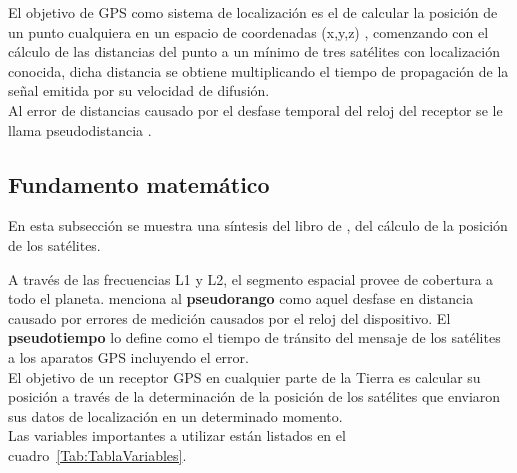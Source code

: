 El objetivo de GPS como sistema de localización es el de calcular la posición de un punto cualquiera en un espacio de coordenadas (x,y,z) \citep{sonnenberg2013radar}, comenzando con el cálculo de las distancias del punto a un mínimo de tres satélites con localización conocida, dicha distancia se obtiene multiplicando el tiempo de propagación de la señal emitida por su velocidad de difusión.\\

Al error de distancias causado por el desfase temporal del reloj del receptor se le llama pseudodistancia \citep{pozo2000sistema}.


\subsection{Fundamento matemático}

En esta subsección se muestra una síntesis del libro de \cite{farrell2008aided}, del cálculo de la posición de los satélites.

A través de las frecuencias L1 y L2, el segmento espacial provee de cobertura a todo el planeta. \cite{farrell2008aided} menciona al \textbf{pseudorango} como aquel desfase en distancia causado por errores de medición causados por el reloj del dispositivo. El \textbf{pseudotiempo} lo define como el tiempo de tránsito del mensaje de los satélites a los aparatos GPS incluyendo el error. \\

El objetivo de un receptor GPS en cualquier parte de la Tierra es calcular su posición a través de la determinación de la posición de los satélites que enviaron sus datos de localización en un determinado momento.\\

Las variables importantes a utilizar están listados en el cuadro~\ref{Tab:TablaVariables}.

